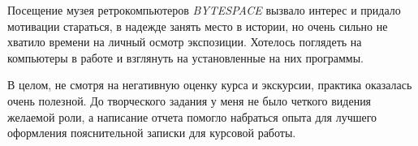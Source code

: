 \documentclass[variant=practice]{bsuir}
\begin{document}
Посещение музея ретрокомпьютеров \textit{BYTESPACE} вызвало интерес и придало
мотивации стараться, в надежде занять место в истории, но очень сильно не
хватило времени на личный осмотр экспозиции. Хотелось поглядеть на компьютеры
в работе и взглянуть на установленные на них программы.

В целом, не смотря на негативную оценку курса и экскурсии, практика оказалась
очень полезной. До творческого задания у меня не было четкого видения желаемой
роли, а написание отчета помогло набраться опыта для лучшего оформления
пояснительной записки для курсовой работы.


\end{document}
